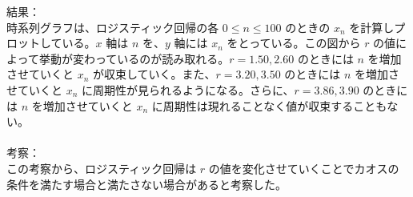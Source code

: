 結果：\\
時系列グラフは、ロジスティック回帰の各 $0 \leq n \leq 100$ のときの $x_n$ を計算しプロットしている。$x$ 軸は $n$ を、$y$ 軸には $x_n$ をとっている。この図から $r$ の値によって挙動が変わっているのが読み取れる。$r = 1.50, 2.60$ のときには $n$ を増加させていくと $x_n$ が収束していく。また、$r = 3.20, 3.50$ のときには $n$ を増加させていくと $x_n$ に周期性が見られるようになる。さらに、$r = 3.86, 3.90$ のときには $n$ を増加させていくと $x_n$ に周期性は現れることなく値が収束することもない。\\\\
考察：\\
この考察から、ロジスティック回帰は $r$ の値を変化させていくことでカオスの条件を満たす場合と満たさない場合があると考察した。\\


